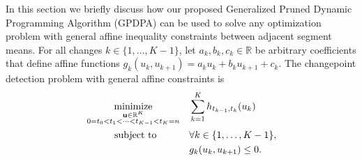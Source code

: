 \documentclass{article}
\newtheorem{definition}{Definition}
\DeclareMathOperator*{\minimize}{minimize}
\newcommand{\RR}{\mathbb R}
\begin{document}



In this section we briefly discuss how our proposed Generalized Pruned
Dynamic Programming Algorithm (GPDPA) can be used to solve any
optimization problem with general affine inequality constraints
between adjacent segment means. For all changes $k\in\{1,\dots,K-1\}$,
let $a_k,b_k,c_k\in\RR$ be arbitrary coefficients that define affine
functions $g_k(u_k, u_{k+1})=a_k u_k + b_k u_{k+1} + c_k$. The
changepoint detection problem with general affine constraints is
\begin{align}
  \label{eq:min_general_affine_inequality}
  &\minimize_{
    \substack{
    \mathbf u\in\RR^K\\
0=t_0<t_1<\cdots<t_{K-1}<t_K=n
}
    } && 
  \sum_{k=1}^K h_{t_{k-1}, t_k}(u_k)\\
  &\text{\hskip 1.05cm subject to} && \forall k\in\{1,\dots,K-1\},
  \nonumber\\
& &&g_k(u_k, u_{k+1})\leq 0.\nonumber                        
\nonumber
\end{align}


\end{document}
